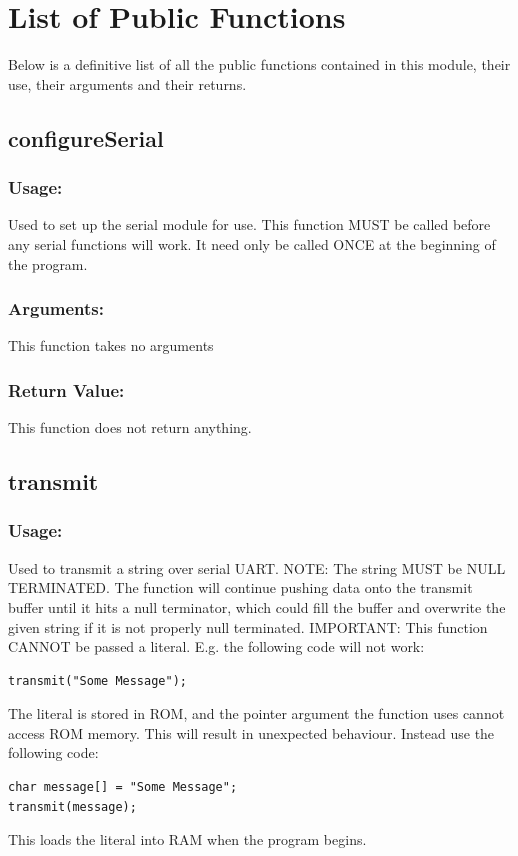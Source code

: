 \documentclass[]{report}
\begin{document}
\section{List of Public Functions}
Below is a definitive list of all the public functions contained in this module, their use, their arguments and their returns.

\subsection{configureSerial}
\subsubsection{Usage:}
Used to set up the serial module for use. This function MUST be called before any serial functions will work. It need only be called ONCE at the beginning of the program.

\subsubsection{Arguments:}
This function takes no arguments

\subsubsection{Return Value:}
This function does not return anything.

\subsection{transmit}
\subsubsection{Usage:}
Used to transmit a string over serial UART. NOTE: The string MUST be NULL TERMINATED. The function will continue pushing data onto the transmit buffer until it hits a null terminator, which could fill the buffer and overwrite the given string if it is not properly null terminated. \newline
IMPORTANT: This function CANNOT be passed a literal. E.g. the following code will not work:
\begin{lstlisting}
transmit("Some Message");
\end{lstlisting} 
The literal is stored in ROM, and the pointer argument the function uses cannot access ROM memory. This will result in unexpected behaviour. Instead use the following code:
\begin{lstlisting}
char message[] = "Some Message";
transmit(message);
\end{lstlisting}
This loads the literal into RAM when the program begins.
\end{document}
